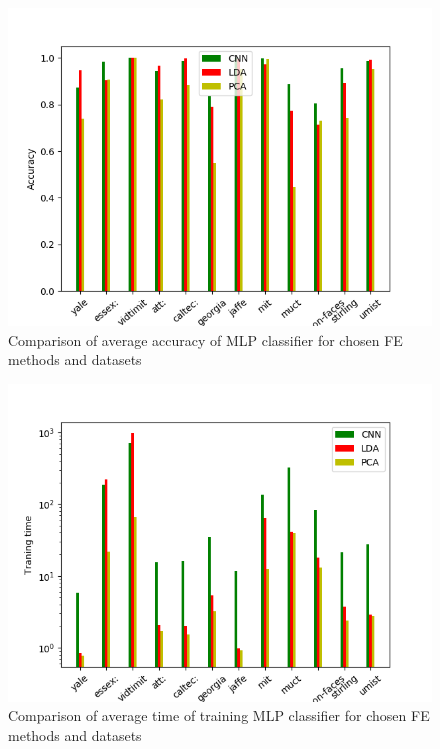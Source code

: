 \documentclass[a4paper, 10 pt, conference]{ieeeconf}
\begin{document}
\begin{figure}[!h]
    \centering
    \includegraphics[scale=0.875]{images/NN_accuracy_comparison.png}
    \caption{Comparison of average accuracy of MLP classifier for chosen FE methods and datasets}
    \label{fig:NN_acc_comparision}
\end{figure}

\begin{figure}[!h]
    \centering
    \includegraphics[scale=0.875]{images/NN_fit_time_comparison.png}
    \caption{Comparison of average time of training MLP classifier for chosen FE methods and datasets}
    \label{fig:svm_fit_time_comparision}
\end{figure}
\end{document}
